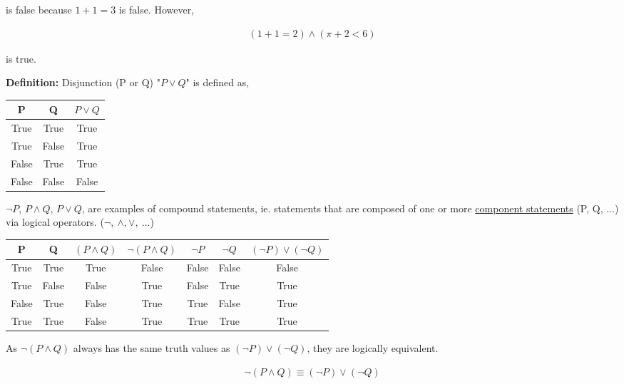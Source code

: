 \documentclass[11pt]{article}
\begin{document}
is false because $1+1=3$ is false. However, 

\begin{align*}
    (1+1 = 2)\wedge(\pi + 2 < 6)
\end{align*}

is true.
\bigskip

\textbf{Definition: } Disjunction (P or Q) "$P \vee Q$" is defined as,

\begin{center}
    \begin{tabular}{ |c|c|c| } 
        \hline
        P & Q & $P \vee Q$ \\ 
        \hline
        True & True & True \\ 
        True & False & True \\
        False & True & True \\
        False & False & False \\ 
        \hline
    \end{tabular}
\end{center}

$\neg P$, $P \wedge Q$, $P \vee Q$, are examples of compound statements, ie. statements that are composed of one or more \underline{component statements} (P, Q, ...) via logical operators. ($\neg,\ \wedge, \vee,\ ...$)

\begin{center}
    \begin{tabular}{ |c|c|c|c|c|c|c| } 
        \hline
        P & Q & $(P \wedge Q)$ & $\neg(P \wedge Q)$ & $\neg P$ & $\neg Q$ & $(\neg P)\vee(\neg Q)$\\ 
        \hline
        True & True & True & False & False & False & False \\ 
        True & False & False & True & False & True & True \\ 
        False & True & False & True & True & False & True \\ 
        True & True & False & True & True & True & True \\ 
        \hline
    \end{tabular}
\end{center}

As $\neg(P \wedge Q)$ always has the same truth values as $(\neg P) \vee (\neg Q)$, they are logically equivalent.

\begin{align*}
    \neg(P \wedge Q) \equiv (\neg P) \vee (\neg Q)
\end{align*}
\end{document}
